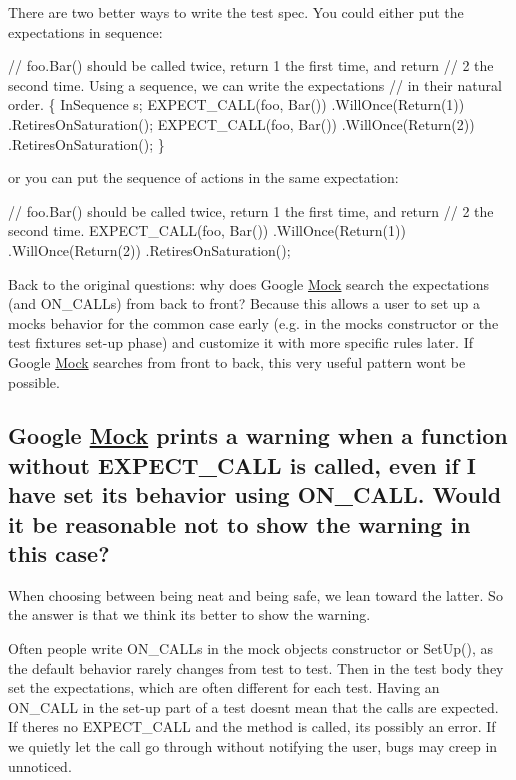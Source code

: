 There are two better ways to write the test spec. You could either put the expectations in sequence\+:


\begin{DoxyCode}
\textcolor{comment}{// foo.Bar() should be called twice, return 1 the first time, and return}
\textcolor{comment}{// 2 the second time.  Using a sequence, we can write the expectations}
\textcolor{comment}{// in their natural order.}
\{
  InSequence s;
  EXPECT\_CALL(foo, Bar())
      .WillOnce(Return(1))
      .RetiresOnSaturation();
  EXPECT\_CALL(foo, Bar())
      .WillOnce(Return(2))
      .RetiresOnSaturation();
\}
\end{DoxyCode}


or you can put the sequence of actions in the same expectation\+:


\begin{DoxyCode}
\textcolor{comment}{// foo.Bar() should be called twice, return 1 the first time, and return}
\textcolor{comment}{// 2 the second time.}
EXPECT\_CALL(foo, Bar())
    .WillOnce(Return(1))
    .WillOnce(Return(2))
    .RetiresOnSaturation();
\end{DoxyCode}


Back to the original questions\+: why does Google \hyperlink{classMock}{Mock} search the expectations (and {\ttfamily O\+N\+\_\+\+C\+A\+LL}s) from back to front? Because this allows a user to set up a mock\textquotesingle{}s behavior for the common case early (e.\+g. in the mock\textquotesingle{}s constructor or the test fixture\textquotesingle{}s set-\/up phase) and customize it with more specific rules later. If Google \hyperlink{classMock}{Mock} searches from front to back, this very useful pattern won\textquotesingle{}t be possible.

\subsection*{Google \hyperlink{classMock}{Mock} prints a warning when a function without E\+X\+P\+E\+C\+T\+\_\+\+C\+A\+LL is called, even if I have set its behavior using O\+N\+\_\+\+C\+A\+LL. Would it be reasonable not to show the warning in this case?}

When choosing between being neat and being safe, we lean toward the latter. So the answer is that we think it\textquotesingle{}s better to show the warning.

Often people write {\ttfamily O\+N\+\_\+\+C\+A\+LL}s in the mock object\textquotesingle{}s constructor or {\ttfamily Set\+Up()}, as the default behavior rarely changes from test to test. Then in the test body they set the expectations, which are often different for each test. Having an {\ttfamily O\+N\+\_\+\+C\+A\+LL} in the set-\/up part of a test doesn\textquotesingle{}t mean that the calls are expected. If there\textquotesingle{}s no {\ttfamily E\+X\+P\+E\+C\+T\+\_\+\+C\+A\+LL} and the method is called, it\textquotesingle{}s possibly an error. If we quietly let the call go through without notifying the user, bugs may creep in unnoticed.

